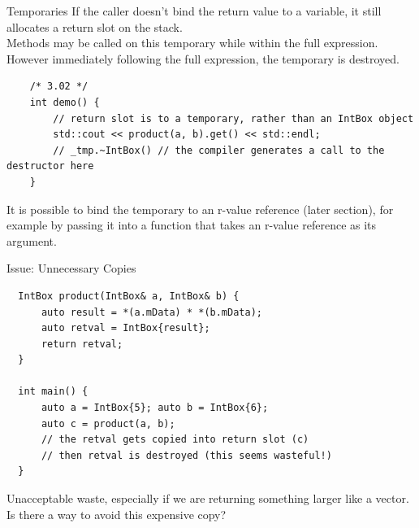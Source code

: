 \begin{frame}[fragile]{Temporaries}
  If the caller doesn't bind the return value to a variable,
  it still allocates a return slot on the stack.\\
  Methods may be called on this temporary while within the full expression.\\
  However immediately following the full expression, the temporary is destroyed.
  \begin{verbatim}
    /* 3.02 */
    int demo() {
        // return slot is to a temporary, rather than an IntBox object
        std::cout << product(a, b).get() << std::endl;
        // _tmp.~IntBox() // the compiler generates a call to the destructor here
    }
  \end{verbatim}

  It is possible to bind the temporary to an r-value reference (later section),
  for example by passing it into a function that takes an r-value reference as its argument.
\end{frame}

\begin{frame}[fragile]{Issue: Unnecessary Copies}
  \begin{verbatim}
  IntBox product(IntBox& a, IntBox& b) {
      auto result = *(a.mData) * *(b.mData);
      auto retval = IntBox{result};
      return retval;
  }

  int main() {
      auto a = IntBox{5}; auto b = IntBox{6};
      auto c = product(a, b);
      // the retval gets copied into return slot (c)
      // then retval is destroyed (this seems wasteful!)
  }
  \end{verbatim}
  Unacceptable waste, especially if we are returning something larger like a vector.\\
  Is there a way to avoid this expensive copy?
\end{frame}
